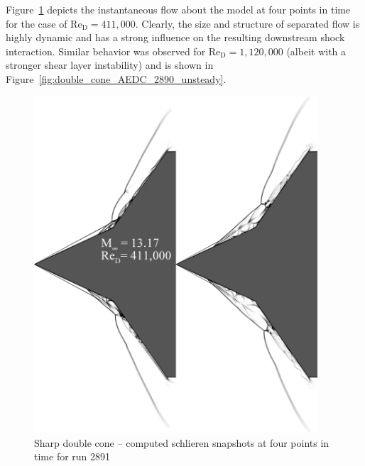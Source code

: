 Figure~\ref{fig:double_cone_AEDC_2891_unsteady} depicts the instantaneous flow about the model at four points in time for the case of Re$_\text{D}=411,000$.  Clearly, the size and structure of separated flow is highly dynamic and has a strong influence on the resulting downstream shock interaction.  Similar behavior was observed for Re$_\text{D}=1,120,000$ (albeit with a stronger shear layer instability) and is shown in Figure~\ref{fig:double_cone_AEDC_2890_unsteady}.  
\begin{figure}[hbtp]
  \begin{center}
    \includegraphics[width=0.94\textwidth]{figures/aedc_double_cone/2891/composite}
    \caption{Sharp double cone -- computed schlieren snapshots at four points in time for run 2891\label{fig:double_cone_AEDC_2891_unsteady}}
  \end{center}
\end{figure}
